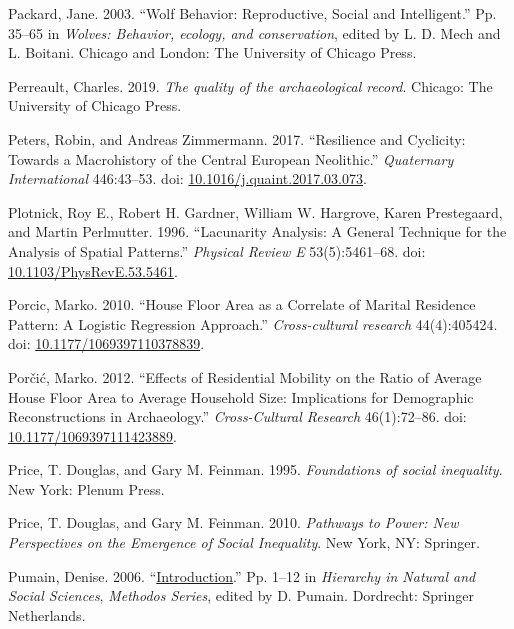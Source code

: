 \documentclass[
  12pt,
]{book}
\newlength{\cslhangindent}
\newlength{\cslentryspacingunit} %
\newenvironment{CSLReferences}[2] %
 {%
  \setlength{\parindent}{0pt}
  \ifodd #1
  \let\oldpar\par
  \def\par{\hangindent=\cslhangindent\oldpar}
  \fi
  \setlength{\parskip}{#2\cslentryspacingunit}
 }%
 {}
\begin{document}
\begin{CSLReferences}{1}{0}
\leavevmode{}%
Packard, Jane. 2003. {``Wolf Behavior: Reproductive, Social and Intelligent.''} Pp. 35--65 in \emph{Wolves: Behavior, ecology, and conservation}, edited by L. D. Mech and L. Boitani. {Chicago and London}: {The University of Chicago Press}.

\leavevmode{}%
Perreault, Charles. 2019. \emph{The quality of the archaeological record}. Chicago: The University of Chicago Press.

\leavevmode{}%
Peters, Robin, and Andreas Zimmermann. 2017. {``Resilience and Cyclicity: Towards a Macrohistory of the Central European Neolithic.''} \emph{Quaternary International} 446:43--53. doi: \href{https://doi.org/10.1016/j.quaint.2017.03.073}{10.1016/j.quaint.2017.03.073}.

\leavevmode{}%
Plotnick, Roy E., Robert H. Gardner, William W. Hargrove, Karen Prestegaard, and Martin Perlmutter. 1996. {``Lacunarity Analysis: A General Technique for the Analysis of Spatial Patterns.''} \emph{Physical Review E} 53(5):5461--68. doi: \href{https://doi.org/10.1103/PhysRevE.53.5461}{10.1103/PhysRevE.53.5461}.

\leavevmode{}%
Porcic, Marko. 2010. {``House Floor Area as a Correlate of Marital Residence Pattern: A Logistic Regression Approach.''} \emph{Cross-cultural research} 44(4):405424. doi: \href{https://doi.org/10.1177/1069397110378839}{10.1177/1069397110378839}.

\leavevmode{}%
Porčić, Marko. 2012. {``Effects of Residential Mobility on the Ratio of Average House Floor Area to Average Household Size: Implications for Demographic Reconstructions in Archaeology.''} \emph{Cross-Cultural Research} 46(1):72--86. doi: \href{https://doi.org/10.1177/1069397111423889}{10.1177/1069397111423889}.

\leavevmode{}%
Price, T. Douglas, and Gary M. Feinman. 1995. \emph{Foundations of social inequality}. New York: Plenum Press.

\leavevmode{}%
Price, T. Douglas, and Gary M. Feinman. 2010. \emph{Pathways to Power: New Perspectives on the Emergence of Social Inequality}. New York, NY: Springer.

\leavevmode{}%
Pumain, Denise. 2006. {``\href{https://doi.org/10.1007/1-4020-4127-6_1}{Introduction}.''} Pp. 1--12 in \emph{Hierarchy in {Natural} and {Social Sciences}}, \emph{Methodos {Series}}, edited by D. Pumain. {Dordrecht}: {Springer Netherlands}.


\end{CSLReferences}
\end{document}
